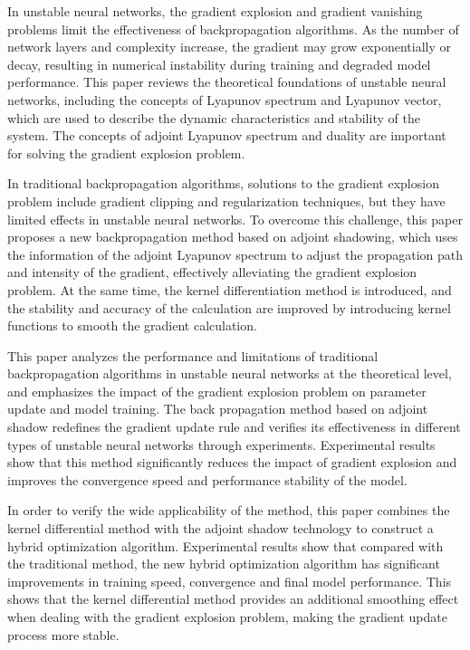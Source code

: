 \begin{abstract*}
  In unstable neural networks, the gradient explosion and gradient vanishing problems limit the effectiveness of backpropagation algorithms. As the number of network layers and complexity increase, the gradient may grow exponentially or decay, resulting in numerical instability during training and degraded model performance. This paper reviews the theoretical foundations of unstable neural networks, including the concepts of Lyapunov spectrum and Lyapunov vector, which are used to describe the dynamic characteristics and stability of the system. The concepts of adjoint Lyapunov spectrum and duality are important for solving the gradient explosion problem.

  In traditional backpropagation algorithms, solutions to the gradient explosion problem include gradient clipping and regularization techniques, but they have limited effects in unstable neural networks. To overcome this challenge, this paper proposes a new backpropagation method based on adjoint shadowing, which uses the information of the adjoint Lyapunov spectrum to adjust the propagation path and intensity of the gradient, effectively alleviating the gradient explosion problem. At the same time, the kernel differentiation method is introduced, and the stability and accuracy of the calculation are improved by introducing kernel functions to smooth the gradient calculation.

  This paper analyzes the performance and limitations of traditional backpropagation algorithms in unstable neural networks at the theoretical level, and emphasizes the impact of the gradient explosion problem on parameter update and model training. The back propagation method based on adjoint shadow redefines the gradient update rule and verifies its effectiveness in different types of unstable neural networks through experiments. Experimental results show that this method significantly reduces the impact of gradient explosion and improves the convergence speed and performance stability of the model.

  In order to verify the wide applicability of the method, this paper combines the kernel differential method with the adjoint shadow technology to construct a hybrid optimization algorithm. Experimental results show that compared with the traditional method, the new hybrid optimization algorithm has significant improvements in training speed, convergence and final model performance. This shows that the kernel differential method provides an additional smoothing effect when dealing with the gradient explosion problem, making the gradient update process more stable.


\end{abstract*}
